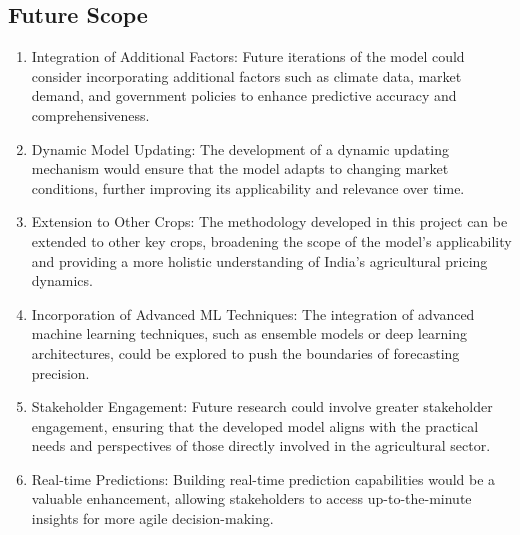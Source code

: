     \subsection{Future Scope}
        \begin{enumerate}
            \item
                Integration of Additional Factors: Future iterations of the model could consider incorporating additional factors such as climate data, market demand, and government policies to enhance predictive accuracy and comprehensiveness.
            
            \item
                Dynamic Model Updating: The development of a dynamic updating mechanism would ensure that the model adapts to changing market conditions, further improving its applicability and relevance over time.
            \item
                Extension to Other Crops: The methodology developed in this project can be extended to other key crops, broadening the scope of the model's applicability and providing a more holistic understanding of India's agricultural pricing dynamics.
            \item
                Incorporation of Advanced ML Techniques: The integration of advanced machine learning techniques, such as ensemble models or deep learning architectures, could be explored to push the boundaries of forecasting precision.
            \item
                Stakeholder Engagement: Future research could involve greater stakeholder engagement, ensuring that the developed model aligns with the practical needs and perspectives of those directly involved in the agricultural sector.
            \item
                Real-time Predictions: Building real-time prediction capabilities would be a valuable enhancement, allowing stakeholders to access up-to-the-minute insights for more agile decision-making.
        \end{enumerate}